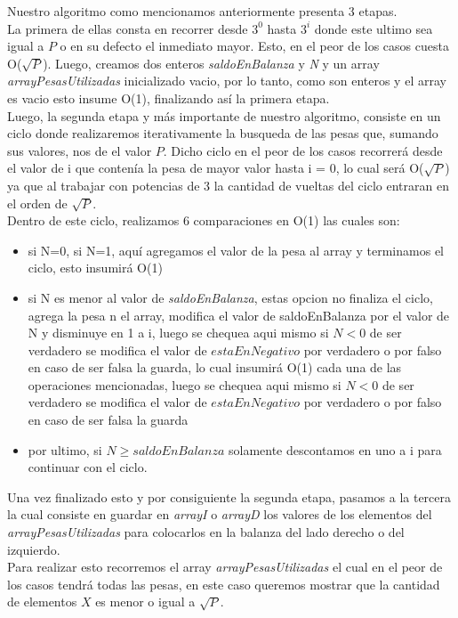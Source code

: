 
Nuestro algoritmo como mencionamos anteriormente presenta 3 etapas.\\
La primera de ellas consta en recorrer desde $3^0$ hasta $3^i$ donde este ultimo sea igual a $P$ o en su defecto el inmediato mayor. Esto, en el peor de los casos cuesta O($\sqrt{P}$). Luego, creamos dos enteros \textit{saldoEnBalanza} y \textit{N} y un array \textit{arrayPesasUtilizadas} inicializado vacio, por lo tanto, como son enteros y el array es vacio esto insume O(1), finalizando as\'i la primera etapa.\\
Luego, la segunda etapa y m\'as importante de nuestro algoritmo, consiste en un ciclo donde realizaremos iterativamente la busqueda de las pesas que, sumando sus valores, nos de el valor $P$. Dicho ciclo en el peor de los casos recorrer\'a desde el valor de i que conten\'ia la pesa de mayor valor hasta i = 0, lo cual ser\'a O($\sqrt{P}$) ya que al trabajar con potencias de 3 la cantidad de vueltas del ciclo entraran en el orden de $\sqrt{P}$.\\ 

Dentro de este ciclo, realizamos 6 comparaciones en O(1) las cuales son:

\begin{itemize}
\item si N=0, si N=1, aqu\'i agregamos el valor de la pesa al array y terminamos el ciclo, esto insumir\'a O(1)
 \item si N es menor al valor de \textit{saldoEnBalanza}, estas opcion no finaliza el ciclo,
 agrega la pesa n el array, modifica el valor de saldoEnBalanza por el valor de N y disminuye en 1 a i, luego se chequea aqui mismo si $N < 0$ de ser verdadero se modifica el valor de $estaEnNegativo$ por verdadero o por falso en caso de ser falsa la guarda, lo cual insumir\'a O(1) cada una de las operaciones mencionadas, luego se chequea aqui mismo si $N < 0$ de ser verdadero se modifica el valor de $estaEnNegativo$ por verdadero o por falso en caso de ser falsa la guarda
 \item por ultimo, si $N \geq saldoEnBalanza$ solamente descontamos en uno a i para continuar con el ciclo.
\end{itemize} 
Una vez finalizado esto y por consiguiente la segunda etapa, pasamos a la tercera la cual consiste en guardar en \textit{arrayI} o \textit{arrayD} los valores de los elementos del \textit{arrayPesasUtilizadas} para colocarlos en la balanza del lado derecho o del izquierdo.\\
Para realizar esto recorremos el array \textit{arrayPesasUtilizadas} el cual en el peor de los casos tendr\'a todas las pesas, en este caso queremos mostrar que la cantidad de elementos $X$ es menor o igual a $\sqrt{P}$.\\

